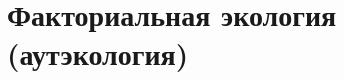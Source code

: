 \documentclass[a5paper, 11pt]{extarticle}
\theoremstyle{definition}
\theoremstyle{definition}
\theoremstyle{definition}
\numberwithin{figure}{section}
\begin{document}





\section{Факториальная экология (аутэкология)}
\end{document}
